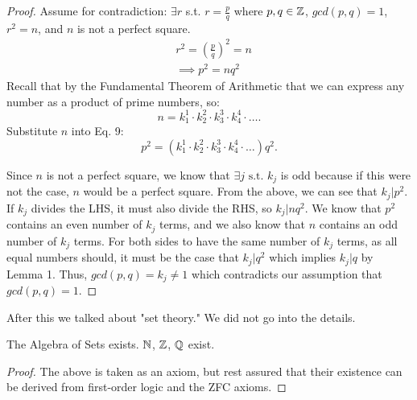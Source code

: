 \begin{proof}
	Assume for contradiction: $\exists r$ s.t.  $r = \frac{p}{q}$ where $p, q \in  \mathbb{Z}$,  $gcd\left( p, q \right) = 1$, $r^{2} = n$, and $n$ is not a perfect square.
	\begin{align}
		&r^{2} = \left( \frac{p}{q} \right) ^{2} = n \\
		& \implies p^{2} = nq^{2} 
	\end{align}
	Recall that by the Fundamental Theorem of Arithmetic that we can express any number as a product of prime numbers, so:
	\[
		n = k_1^{1} \cdot k_2^{2} \cdot k_3^{3} \cdot k_4^{4} \cdot \ldots      
	.\] 
	Substitute $n$ into Eq. 9:
	\[
		p^{2} = \left( k_1^{1} \cdot k_2^{2} \cdot k_3^{3} \cdot k_4^{4} \cdot \ldots \right) q^{2} 
	.\] 

	Since $n$ is not a perfect square, we know that $\exists j \text{ s.t. } k_j$ is odd because if this were not the case, $n$ would be a perfect square. From the above, we can see that $k_j | p^{2}$. If $k_j$ divides the LHS, it must also divide the RHS, so $k_j | nq^{2}$. We know that $p^{2}$ contains an even number of $k_j$ terms, and we also know that $n$ contains an odd number of $k_j$ terms. For both sides to have the same number of $k_j$ terms, as all equal numbers should, it must be the case that $k_j | q^{2}$ which implies $k_j | q$ by Lemma 1. Thus,  $gcd\left( p, q \right) = k_j \neq 1$ which contradicts our assumption that $gcd\left( p, q \right) = 1$.
\end{proof}

After this we talked about "set theory." We did not go into the details. 

\begin{theorem}
	The Algebra of Sets exists. $\mathbb{N}$, $\mathbb{Z}$, $\mathbb{Q}$ exist.	
\end{theorem}

\begin{proof}
	The above is taken as an axiom, but rest assured that their existence can be derived from first-order logic and the ZFC axioms. 
\end{proof}
